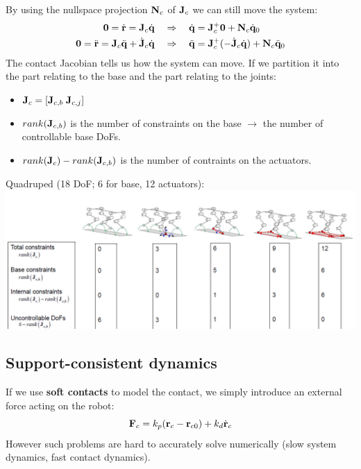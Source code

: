 \documentclass[a4paper, 8pt]{extarticle}
\begin{document}
\begin{multicols*}{3}
By using the nullspace projection ${\bf N}_c$ of ${\bf J}_c$ we can still move the system:
\begin{align*}
{\bf 0} = \dot{\bf r} = {\bf J}_c\dot{\bf q}   &\quad\Rightarrow\quad   \dot{\bf q} = {\bf J}_c^+ {\bf 0} + {\bf N}_c \dot{\bf q}_0 \\ 
{\bf 0} = \ddot{\bf r} = {\bf J}_c\ddot{\bf q} + \dot{\bf J}_c\dot{\bf q}  &\quad\Rightarrow\quad  \ddot{\bf q} = {\bf J}_c^+ (-\dot{\bf J}_c\dot{\bf q}) + {\bf N}_c \ddot{\bf q}_0 
\end{align*}
The contact Jacobian tells us how the system can move. If we partition it into the part relating to the base and the part relating to the joints: 
\begin{itemize}
\item ${\bf J}_c = [{\bf J}_{c,b} \; {\bf J}_{c,j} ]$
\item $rank({\bf J}_{c,b})$ is the number of constraints on the base $\rightarrow$ the number of controllable base DoFs.
\item $rank({\bf J}_c) - rank({\bf J}_{c,b})$ is the number of contraints on the actuators.
\end{itemize}

Quadruped (18 DoF; 6 for base, 12 actuators):\\
\includegraphics[width=1.05\linewidth,frame]{images/Contraints_Quad.PNG}



\subsection{Support-consistent dynamics}
If we use {\bf soft contacts} to model the contact, we simply introduce an external force acting on the robot:
$${\bf F}_c = k_p({\bf r}_c - {\bf r}_{c0}) + k_d\dot{\bf r}_c$$
However such problems are hard to accurately solve numerically (slow system dynamics, fast contact dynamics). 


\end{multicols*}
\end{document}

